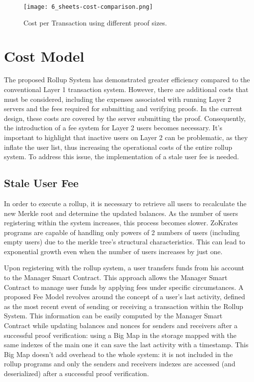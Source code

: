 \begin{figure}[ht]
	\centering
	\texttt{[image: 6\_sheets-cost-comparison.png]}
	\caption[Cost Comparison]{Cost per Transaction using different proof sizes.}
	\label{fig:7_sheets-cost-comparison.png}
\end{figure}

\section{Cost Model}

The proposed Rollup System has demonstrated greater efficiency compared to the conventional Layer 1 transaction system. However, there are additional costs that must be considered, including the expenses associated with running Layer 2 servers and the fees required for submitting and verifying proofs. In the current design, these costs are covered by the server submitting the proof. Consequently, the introduction of a fee system for Layer 2 users becomes necessary. It's important to highlight that inactive users on Layer 2 can be problematic, as they inflate the user list, thus increasing the operational costs of the entire rollup system. To address this issue, the implementation of a stale user fee is needed.

\subsection{Stale User Fee\label{subsec:7_staleuserfee}}

In order to execute a rollup, it is necessary to retrieve all users to recalculate the new Merkle root and determine the updated balances. As the number of users registering within the system increases, this process becomes slower. ZoKrates programs are capable of handling only powers of 2 numbers of users (including empty users) due to the merkle tree's structural characteristics. This can lead to exponential growth even when the number of users increases by just one.

Upon registering with the rollup system, a user transfers funds from his account to the Manager Smart Contract. This approach allows the Manager Smart Contract to manage user funds by applying fees under specific circumstances. A proposed Fee Model revolves around the concept of a user's last activity, defined as the most recent event of sending or receiving a transaction within the Rollup System. This information can be easily computed by the Manager Smart Contract while updating balances and nonces for senders and receivers after a successful proof verification: using a Big Map in the storage mapped with the same indexes of the main one it can save the last activity with a timestamp. This Big Map doesn't add overhead to the whole system: it is not included in the rollup programs and only the senders and receivers indexes are accessed (and deserialized) after a successful proof verification.


